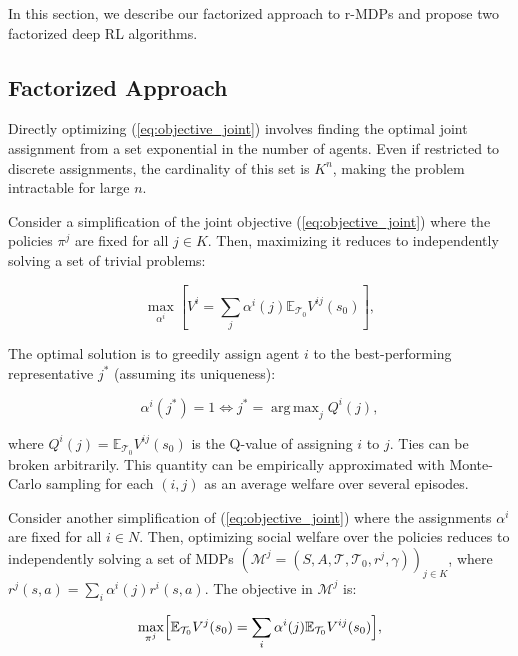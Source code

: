 \documentclass[letterpaper]{article} %
\DeclareMathOperator*{\argmax}{arg\,max}
\begin{document}
In this section, we describe our factorized approach to r-MDPs and propose two factorized deep RL algorithms.

\subsection{Factorized Approach}
\label{sec:our_factorized}

Directly optimizing (\ref{eq:objective_joint}) involves finding the optimal joint assignment from a set exponential in the number of agents. Even if restricted to discrete assignments, the cardinality of this set is $K^n$, making the problem intractable for large $n$.

Consider a simplification of the joint objective (\ref{eq:objective_joint}) where the policies $\pi^j$ are fixed for all $j \in K$. Then, maximizing it reduces to independently solving a set of trivial problems:

\begin{equation}\label{eq:objective_assignment}
    \max_{\alpha^i} \left[ V^i =  \sum_j \alpha^i(j) \mathbb{E}_{\mathcal{T}_0} V^{ij}(s_0) \right],
\end{equation}

The optimal solution is to greedily assign agent $i$ to the best-performing representative $j^*$ (assuming its uniqueness):

\begin{equation}\label{eq:optimal_assignment}
    \alpha^i(j^*) = 1 \iff j^* = \argmax_j Q^i(j),
\end{equation}

\noindent where $Q^i(j) = \mathbb{E}_{\mathcal{T}_0} V^{ij}(s_0)$ is the Q-value of assigning $i$ to $j$. Ties can be broken arbitrarily. This quantity can be empirically approximated with Monte-Carlo sampling for each $(i, j)$ as an average welfare over several episodes.

Consider another simplification of (\ref{eq:objective_joint}) where the assignments $\alpha^i$ are fixed for all $i \in N$. Then, optimizing social welfare over the policies reduces to independently solving a set of MDPs $(\mathcal{M}^j = (S, A, \mathcal{T}, \mathcal{T}_0, r^j, \gamma))_{j \in K}$, where $r^j(s, a) = \sum_i \alpha^i(j) r^i(s, a)$.  The objective in $\mathcal{M}^j$ is:

\begin{equation}\label{eq:objective_policy}
    \max_{\pi^{j}} \Bigl[ \mathbb{E}_{\mathcal{T}_0} V^j(s_0) = \sum_i \alpha^i(j) \mathbb{E}_{\mathcal{T}_0} V^{ij}(s_0) \Bigr],
\end{equation}
\end{document}
